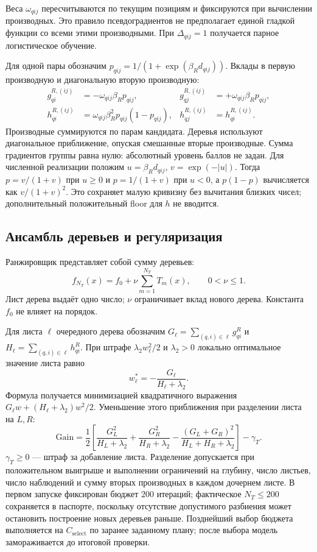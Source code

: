 \documentclass[12pt,a4paper]{article}
\theoremstyle{plainru}
\begin{document}
Веса $\omega_{qij}$ пересчитываются по текущим позициям
и фиксируются при вычислении производных. Это правило псевдоградиентов
не предполагает единой гладкой функции со всеми этими производными.
При $\Delta_{qij}=1$ получается парное логистическое обучение.

Для одной пары обозначим
$p_{qij}=1/(1+\exp(\beta_Rd_{qij}))$.
Вклады в первую производную и диагональную вторую производную:
\begin{align}\label{eq:model-lambda-derivatives}
g_{qi}^{R,(ij)}&=-\omega_{qij}\beta_Rp_{qij},&
g_{qj}^{R,(ij)}&=+\omega_{qij}\beta_Rp_{qij},\\
h_{qi}^{R,(ij)}&=\omega_{qij}\beta_R^2p_{qij}(1-p_{qij}),&
h_{qj}^{R,(ij)}&=h_{qi}^{R,(ij)}.\nonumber
\end{align}
Производные суммируются по парам кандидата. Деревья используют
диагональное приближение, опуская смешанные вторые производные.
Сумма градиентов группы равна нулю: абсолютный уровень баллов не задан.
Для численной реализации положим $u=\beta_Rd_{qij}$,
$v=\exp(-|u|)$. Тогда $p=v/(1+v)$ при $u\ge0$ и $p=1/(1+v)$
при $u<0$, а $p(1-p)$ вычисляется как $v/(1+v)^2$.
Это сохраняет малую кривизну без вычитания близких чисел;
дополнительный положительный floor для $h$ не вводится.

\subsection{Ансамбль деревьев и регуляризация}

Ранжировщик представляет собой сумму деревьев:
\begin{equation}\label{eq:model-boosted-trees}
f_{N_T}(x)=f_0+\nu\sum_{m=1}^{N_T} T_m(x),\qquad 0<\nu\le1.
\end{equation}
Лист дерева выдаёт одно число; $\nu$ ограничивает вклад нового дерева.
Константа $f_0$ не влияет на порядок.

Для листа $\ell$ очередного дерева обозначим
$G_\ell=\sum_{(q,i)\in\ell}g_{qi}^{R}$ и
$H_\ell=\sum_{(q,i)\in\ell}h_{qi}^{R}$.
При штрафе $\lambda_2 w_\ell^2/2$ и $\lambda_2>0$
локально оптимальное значение листа равно
\begin{equation}\label{eq:model-newton-leaf}
w_\ell^*=-\frac{G_\ell}{H_\ell+\lambda_2}.
\end{equation}
Формула получается минимизацией квадратичного выражения
$G_\ell w+(H_\ell+\lambda_2)w^2/2$.
Уменьшение этого приближения при разделении листа на $L,R$:
\begin{equation}\label{eq:model-tree-gain}
\mathrm{Gain}=\frac12\left[
\frac{G_L^2}{H_L+\lambda_2}+
\frac{G_R^2}{H_R+\lambda_2}-
\frac{(G_L+G_R)^2}{H_L+H_R+\lambda_2}\right]-\gamma_T.
\end{equation}
$\gamma_T\ge0$ --- штраф за добавление листа.
Разделение допускается при положительном выигрыше и выполнении
ограничений на глубину, число листьев, число наблюдений
и сумму вторых производных в каждом дочернем листе.
В первом запуске фиксирован бюджет $200$ итераций; фактическое
$N_T\le200$ сохраняется в паспорте, поскольку отсутствие допустимого
разбиения может остановить построение новых деревьев раньше.
Позднейший выбор бюджета выполняется на \(C_{\mathrm{select}}\) по заранее
заданному плану; после выбора модель замораживается до итоговой проверки.
\end{document}

